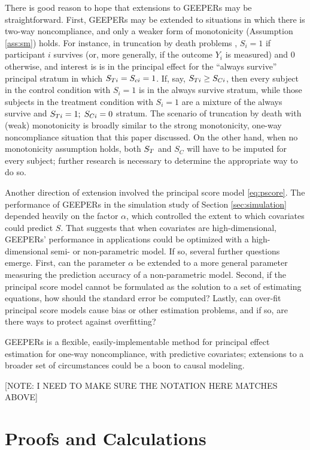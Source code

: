 \documentclass{statsoc} %
\begin{document}
There is good reason to hope that extensions to GEEPERs may be straightforward.
First, GEEPERs may be extended to situations in which there is two-way noncompliance, and only a weaker form of monotonicity (Assumption \ref{ass:sm}) holds.
For instance, in truncation by death problems \citep[e.g.][]{zhangRubin,ding2011}, $S_i=1$ if participant $i$ survives (or, more generally, if the outcome $Y_i$ is measured) and 0 otherwise, and interest is is in the principal effect for the ``always survive'' principal stratum in which $S_{Ti}=S_{ci}=1$.
If, say, $S_{Ti}\ge S_{Ci}$, then every subject in the control condition with $S_i=1$ is in the always survive stratum, while those subjects in the treatment condition with $S_i=1$ are a mixture of the always survive and $S_{Ti}=1;\;S_{Ci}=0$ stratum.
The scenario of truncation by death with (weak) monotonicity is broadly similar to the strong monotonicity, one-way noncompliance situation that this paper discussed.
On the other hand, when no monotonicity assumption holds, both $S_T$ and $S_C$ will have to be imputed for every subject; further research is necessary to determine the appropriate way to do so.

Another direction of extension involved the principal score model \eqref{eq:pscore}.
The performance of GEEPERs in the simulation study of Section \ref{sec:simulation} depended heavily on the factor $\alpha$, which controlled the extent to which covariates could predict $S$.
That suggests that when covariates are high-dimensional, GEEPERs' performance in applications could be optimized with a high-dimensional semi- or non-parametric model.
If so, several further questions emerge.
First, can the parameter $\alpha$ be extended to a more general parameter measuring the prediction accuracy of a non-parametric model.
Second, if the principal score model cannot be formulated as the solution to a set of estimating equations, how should the standard error be computed?
Lastly, can over-fit principal score models cause bias or other estimation problems, and if so, are there ways to protect against overfitting?

GEEPERs is a flexible, easily-implementable method for principal effect estimation for one-way noncompliance, with predictive covariates; extensions to a broader set of circumstances could be a boon to causal modeling.



\appendix

[NOTE: I NEED TO MAKE SURE THE NOTATION HERE MATCHES ABOVE]
\section{Proofs and Calculations}
\end{document}
